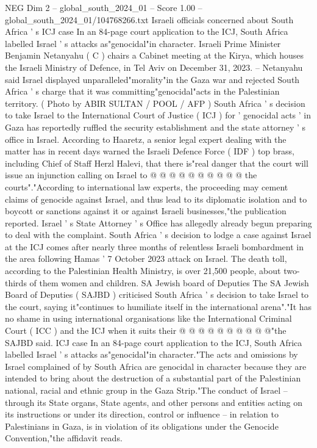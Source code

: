 \begin{textsample}{NEG Dim 2 – global\_south\_2024\_01 – Score 1.00 – global\_south\_2024\_01/104768266.txt}  \label{ex:f2_neg_349}
Israeli officials concerned about South Africa ' s ICJ case In an 84-page court application to the ICJ, South Africa labelled Israel ' s attacks as"genocidal"in character.
Israeli Prime Minister Benjamin Netanyahu ( C ) chairs a Cabinet meeting at the Kirya, which houses the Israeli Ministry of Defence, in Tel Aviv on December 31, 2023. -- Netanyahu said Israel displayed unparalleled"morality"in the Gaza war and rejected South Africa ' s charge that it was committing"genocidal"acts in the Palestinian territory. ( Photo by ABIR SULTAN / POOL / AFP ) South Africa ' s decision to take Israel to the International Court of Justice ( ICJ ) for ' genocidal acts ' in Gaza has reportedly ruffled the security establishment and the state attorney ' s office in Israel.
According to Haaretz, a senior legal expert dealing with the matter has in recent days warned the Israeli Defence Force ( IDF ) top brass, including Chief of Staff Herzl Halevi, that there is"real danger that the court will issue an injunction calling on Israel to @ @ @ @ @ @ @ @ @ @ the courts"."According to international law experts, the proceeding may cement claims of genocide against Israel, and thus lead to its diplomatic isolation and to boycott or sanctions against it or against Israeli businesses,"the publication reported.
Israel ' s State Attorney ' s Office has allegedly already begun preparing to deal with the complaint.
South Africa ' s decision to lodge a case against Israel at the ICJ comes after nearly three months of relentless Israeli bombardment in the area following Hamas ' 7 October 2023 attack on Israel.
The death toll, according to the Palestinian Health Ministry, is over 21,500 people, about two-thirds of them women and children.
SA Jewish board of Deputies The SA Jewish Board of Deputies ( SAJBD ) criticised South Africa ' s decision to take Israel to the court, saying it"continues to humiliate itself in the international arena"."It has no shame in using international organisations like the International Criminal Court ( ICC ) and the ICJ when it suits their @ @ @ @ @ @ @ @ @ @"the SAJBD said.
ICJ case In an 84-page court application to the ICJ, South Africa labelled Israel ' s attacks as"genocidal"in character."The acts and omissions by Israel complained of by South Africa are genocidal in character because they are intended to bring about the destruction of a substantial part of the Palestinian national, racial and ethnic group in the Gaza Strip."The conduct of Israel -- through its State organs, State agents, and other persons and entities acting on its instructions or under its direction, control or influence -- in relation to Palestinians in Gaza, is in violation of its obligations under the Genocide Convention,"the affidavit reads.

\end{textsample}
